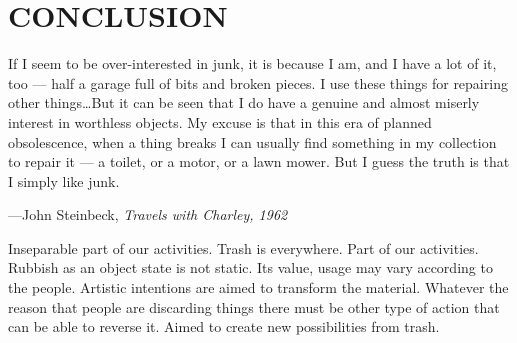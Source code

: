 \chapter{CONCLUSION}





%
%
\begin{singlespace}
\epigraph{If I seem to be over-interested in junk, it is because I am, and I have a lot of it, too --- half a garage full of bits and broken pieces. I use these things for repairing other things\ldots But it can be seen that I do have a genuine and almost miserly interest in worthless objects. My excuse is that in this era of planned obsolescence, when a thing breaks I can usually find something in my collection to repair it --- a toilet, or a motor, or a lawn mower. But I guess the truth is that I simply like junk.}{\hfill---John Steinbeck, \textit{Travels with Charley, 1962}}
\end{singlespace}






Inseparable part of our activities.
Trash is everywhere. Part of our activities. Rubbish as an object state is not static. Its value, usage may vary according to the people. Artistic intentions are aimed to transform the material. Whatever the reason that people are discarding things there must be other type of action that can be able to reverse it. Aimed to create new possibilities from trash.




